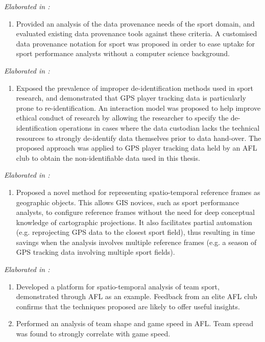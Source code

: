 \textit{Elaborated in :}
\begin{enumerate}
  \setcounter{enumi}{\value{contribnum}}
  \item Provided an analysis of the data provenance needs of the sport domain, and evaluated existing data provenance tools against these criteria. A customised data provenance notation for sport was proposed in order to ease uptake for sport performance analysts without a computer science background.
  \setcounter{contribnum}{\value{enumi}}
\end{enumerate}

\newpage{}

\textit{Elaborated in :}
\begin{enumerate}
  \setcounter{enumi}{\value{contribnum}}
  \item Exposed the prevalence of improper de-identification methods used in sport research, and demonstrated that GPS player tracking data is particularly prone to re-identification. An interaction model was proposed to help improve ethical conduct of research by allowing the researcher to specify the de-identification operations in cases where the data custodian lacks the technical resources to strongly de-identify data themselves prior to data hand-over. The proposed approach was applied to GPS player tracking data held by an AFL club to obtain the non-identifiable data used in this thesis.
  \setcounter{contribnum}{\value{enumi}}
\end{enumerate}

\textit{Elaborated in :}
\begin{enumerate}
  \setcounter{enumi}{\value{contribnum}}
  \item Proposed a novel method for representing spatio-temporal reference frames as geographic objects. This allows GIS novices, such as sport performance analysts, to configure reference frames without the need for deep conceptual knowledge of cartographic projections. It also facilitates partial automation (e.g. reprojecting GPS data to the closest sport field), thus resulting in time savings when the analysis involves multiple reference frames (e.g. a season of GPS tracking data involving multiple sport fields).
  \setcounter{contribnum}{\value{enumi}}
\end{enumerate}

\textit{Elaborated in :}
\begin{enumerate}
  \setcounter{enumi}{\value{contribnum}}
  \item Developed a platform for spatio-temporal analysis of team sport, demonstrated through AFL as an example. Feedback from an elite AFL club confirms that the techniques proposed are likely to offer useful insights.
  \item Performed an analysis of team shape and game speed in AFL. Team spread was found to strongly correlate with game speed.
\end{enumerate}

